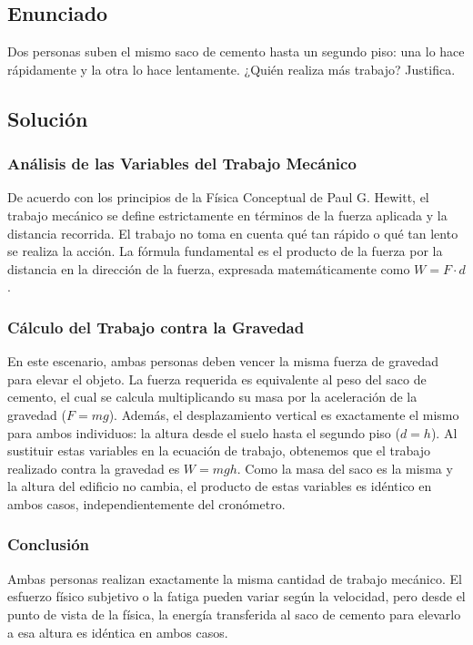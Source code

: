 \documentclass[a4paper,12pt]{article}
\begin{document}
\newpage

\subsection*{Enunciado}
Dos personas suben el mismo saco de cemento hasta un segundo piso: una lo hace rápidamente y la otra lo hace lentamente.
¿Quién realiza más trabajo? Justifica.

\subsection*{Solución}

\subsubsection*{Análisis de las Variables del Trabajo Mecánico}
De acuerdo con los principios de la Física Conceptual de Paul G. Hewitt, el trabajo mecánico se define estrictamente en términos de la fuerza aplicada y la distancia recorrida. El trabajo no toma en cuenta qué tan rápido o qué tan lento se realiza la acción. La fórmula fundamental es el producto de la fuerza por la distancia en la dirección de la fuerza, expresada matemáticamente como $W = F \cdot d$.

\subsubsection*{Cálculo del Trabajo contra la Gravedad}
En este escenario, ambas personas deben vencer la misma fuerza de gravedad para elevar el objeto. La fuerza requerida es equivalente al peso del saco de cemento, el cual se calcula multiplicando su masa por la aceleración de la gravedad ($F = mg$). Además, el desplazamiento vertical es exactamente el mismo para ambos individuos: la altura desde el suelo hasta el segundo piso ($d = h$).
Al sustituir estas variables en la ecuación de trabajo, obtenemos que el trabajo realizado contra la gravedad es $W = mgh$. Como la masa del saco es la misma y la altura del edificio no cambia, el producto de estas variables es idéntico en ambos casos, independientemente del cronómetro.

\subsubsection*{Conclusión}
Ambas personas realizan exactamente la misma cantidad de trabajo mecánico. El esfuerzo físico subjetivo o la fatiga pueden variar según la velocidad, pero desde el punto de vista de la física, la energía transferida al saco de cemento para elevarlo a esa altura es idéntica en ambos casos.
\end{document}
